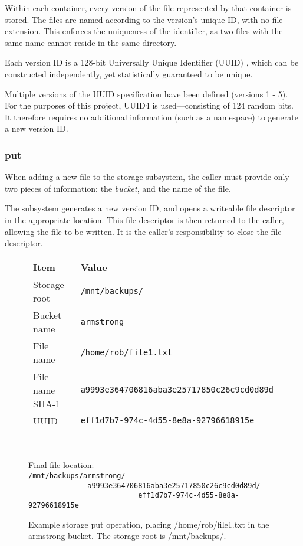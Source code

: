 Within each container, every version of the file represented by that container
is stored. The files are named according to the version's unique ID, with no
file extension. This enforces the uniqueness of the identifier, as two files
with the same name cannot reside in the same directory.

Each version ID is a 128-bit Universally Unique Identifier (UUID)
\cite{rfc4122}, which can be constructed independently, yet statistically
guaranteed to be unique.

Multiple versions of the UUID specification have been defined (versions 1 - 5).
For the purposes of this project, UUID4 is used---consisting of 124 random
bits. It therefore requires no additional information (such as a namespace) to
generate a new version ID.

\subsubsection{put}
\label{sec:implementation-server-storage-put}

When adding a new file to the storage subsystem, the caller must provide only
two pieces of information: the \emph{bucket}, and the name of the file.

The subsystem generates a new version ID, and opens a writeable file descriptor
in the appropriate location. This file descriptor is then returned to the
caller, allowing the file to be written. It is the caller's responsibility to
close the file descriptor.

\begin{figure}
    \begin{center}
        \begin{tabular}{l l}
            \textbf{Item}   & \textbf{Value}                                 \\
            Storage root    & \verb!/mnt/backups/!                           \\
            Bucket name     & \verb!armstrong!                               \\
            File name       & \verb!/home/rob/file1.txt!                     \\
            File name SHA-1 & \verb!a9993e364706816aba3e25717850c26c9cd0d89d!\\
            UUID            & \verb!eff1d7b7-974c-4d55-8e8a-92796618915e!    \\
        \end{tabular} \\
    \end{center}
        Final file location: \\
        \verb!/mnt/backups/armstrong/! \\
        \verb!              a9993e364706816aba3e25717850c26c9cd0d89d/! \\
        \verb!                          eff1d7b7-974c-4d55-8e8a-92796618915e!
    \caption{Example storage put operation, placing /home/rob/file1.txt in the
    armstrong bucket. The storage root is /mnt/backups/.}
    \label{fig:storage-put-example}
\end{figure}

